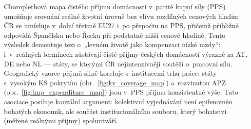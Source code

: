 Choroplethová mapa čistého příjmu domácností v~paritě kupní síly (\ac{PPS}) umožňuje srovnání reálné životní úrovně bez vlivu rozdílných cenových hladin: ČR se umísťuje v~dolní třetině EU27 i~po přepočtu na \ac{PPS}, přičemž přibližně odpovídá Španělsku nebo Řecku při podstatně nižší cenové hladině.
Tento výsledek dementuje tezi o~„levném životě jako kompenzaci nízké mzdy“: i~v~reálných termínech zůstávají čisté příjmy českých domácností výrazně za AT, DE nebo NL --- státy, se kterými ČR nejintenzivněji soutěží o~pracovní sílu.
Geografický vzorec příjmů silně koreluje s~institucemi trhu práce: státy s~vysokým \ac{KS} pokrytím (obr.~\ref{fig:kv_coverage_map}) a~rozvinutou \ac{APZ} (obr.~\ref{fig:lmp_expenditure_map}) jsou v~\ac{PPS} příjmu konzistentně výše.
Tato asociace posiluje kauzální argument: kolektivní vyjednávání není epifenomén bohatých ekonomik, ale součást institucionálního souboru, který bohatství (měřené reálnými příjmy) spoluutváří.


